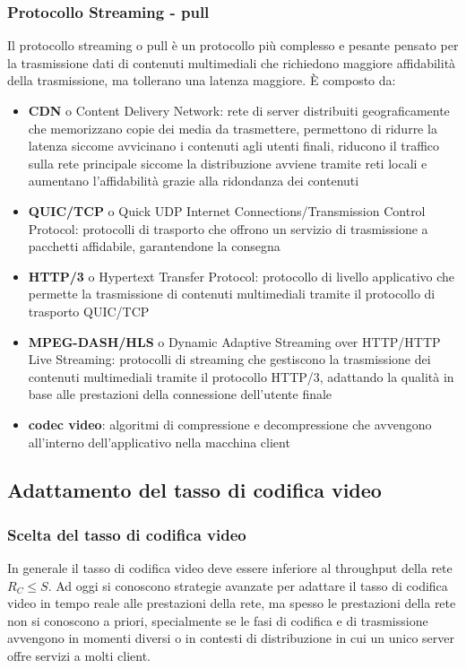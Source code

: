\subsubsection*{Protocollo Streaming - pull}
Il protocollo streaming o pull è un protocollo più complesso e pesante pensato per la trasmissione dati di contenuti
multimediali che richiedono maggiore affidabilità della trasmissione, ma tollerano una latenza maggiore. È composto da:
\begin{itemize}
	\item \textbf{CDN} o Content Delivery Network: rete di server distribuiti geograficamente che memorizzano copie dei
	media da trasmettere, permettono di ridurre la latenza siccome avvicinano i contenuti agli utenti finali, riducono
	il traffico sulla rete principale siccome la distribuzione avviene tramite reti locali e aumentano l'affidabilità
	grazie alla ridondanza dei contenuti
	\item \textbf{QUIC/TCP} o Quick UDP Internet Connections/Transmission Control Protocol: protocolli di trasporto che
	offrono un servizio di trasmissione a pacchetti affidabile, garantendone la consegna
	\item \textbf{HTTP/3} o Hypertext Transfer Protocol: protocollo di livello applicativo che permette la trasmissione
	di contenuti multimediali tramite il protocollo di trasporto QUIC/TCP
	\item \textbf{MPEG-DASH/HLS} o Dynamic Adaptive Streaming over HTTP/HTTP Live Streaming: protocolli di streaming che
	gestiscono la trasmissione dei contenuti multimediali tramite il protocollo HTTP/3, adattando la qualità in base alle
	prestazioni della connessione dell'utente finale
	\item \textbf{codec video}: algoritmi di compressione e decompressione che avvengono all'interno dell'applicativo nella
	macchina client
\end{itemize}

\subsection{Adattamento del tasso di codifica video}
\subsubsection*{Scelta del tasso di codifica video}
In generale il tasso di codifica video deve essere inferiore al throughput della rete \(R_C \leq S\). Ad oggi si
conoscono strategie avanzate per adattare il tasso di codifica video in tempo reale alle prestazioni della rete,
ma spesso le prestazioni della rete non si conoscono a priori, specialmente se le fasi di codifica e di trasmissione
avvengono in momenti diversi o in contesti di distribuzione in cui un unico server offre servizi a molti client.

